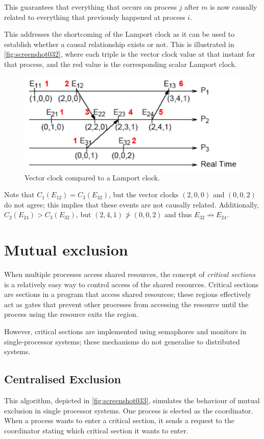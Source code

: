 This guarantees that everything that occurs on process $j$ after $m$ is now causally related to everything that previously happened at process $i$.

This addresses the shortcoming of the Lamport clock as it can be used to establish whether a causal relationship exists or not. This is illustrated in \autoref{fig:screenshot032}, where each triple is the vector clock value at that instant for that process, and the red value is the corresponding scalar Lamport clock.

\begin{figure}
\centering
\includegraphics[width=0.7\linewidth]{figures/screenshot032}
\caption{Vector clock compared to a Lamport clock.}
\label{fig:screenshot032}
\end{figure}


Note that $C_1(E_{12}) = C_3(E_{32})$, but the vector clocks $(2, 0, 0)$ and $(0, 0, 2)$ do not agree; this implies that these events are not causally related. Additionally, $C_2(E_{24}) > C_3(E_{32})$, but $(2, 4, 1) \not> (0, 0, 2)$ and thus $E_{32} \not\rightarrow E_{24}$.

\section{Mutual exclusion}
When multiple processes access shared resources, the concept of \textit{critical sections} is a relatively easy way to control access of the shared resources. Critical sections are sections in a program that access shared resources; these regions effectively act as gates that prevent other processes from accessing the resource until the process using the resource exits the region.

However, critical sections are implemented using semaphores and monitors in single-processor systems; these mechanisms do not generalise to distributed systems.

\subsection{Centralised Exclusion}
This algorithm, depicted in \autoref{fig:screenshot033}, simulates the behaviour of mutual exclusion in single processor systems. One process is elected as the coordinator. When a process wants to enter a critical section, it sends a request to the coordinator stating which critical section it wants to enter.

